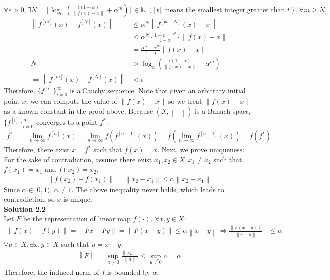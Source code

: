 \documentclass[a4paper,10.5pt]{article}
\newcommand{\N}{\mathbb{N}}
\newcommand{\norm}[1]{\left\lVert#1\right\rVert}
\begin{document}
$\forall \epsilon>0,\exists N = \bigg\lceil \log_\alpha\left(\frac{\epsilon(1-\alpha)}{\norm{f(x)-x}}+\alpha^m\right) \bigg\rceil \in \N \ (\lceil t \rceil \text{ means the smallest integer greater than } t),\forall m \geq N,$
\begin{align*}
\norm{f^{[m]}(x)-f^{[N]}(x)} 
&\leq \alpha^N \norm{f^{[m-N]}(x)-x} \\
&\leq \alpha^N \cdot \frac{1-\alpha^{m-N}}{1-\alpha} \cdot \norm{f(x)-x} \\
&= \frac{\alpha^N-\alpha^{m}}{1-\alpha} \norm{f(x)-x} \\
N&>\log_\alpha\left(\frac{\epsilon(1-\alpha)}{\norm{f(x)-x}}+\alpha^m\right) \\
\Rightarrow \norm{f^{[m]}(x)-f^{[N]}(x)} &< \epsilon
\end{align*}
Therefore, $\{f^{[i]}\}_{i=0}^{\infty}$ is a Cauchy sequence.
Note that given an arbitrary initial point $x$, we can compute the value of $\|f(x)-x\|$ so we treat $\|f(x)-x\|$ as a known constant in the proof above. Because $\left(X, \left\lVert\cdot\right\rVert\right)$ is a Banach space, $\{f^{[i]}\}_{i=0}^{\infty}$ converges to a point $f^*$.
\begin{align*}
	f^* &=\lim_{n\to\infty}f^{[n]}(x) = \lim_{n\to\infty}f\left(f^{[n-1]}(x)\right) = f\left(\lim_{n\to\infty}f^{[n-1]}(x)\right) = f(f^*) 
\end{align*}
Therefore, there exist $\bar{x}=f^*$ such that $f(\bar{x}) = \bar{x}$. Next, we prove uniqueness: For the sake of contradiction, assume there exist $\bar{x}_1,\bar{x}_2 \in X, \bar{x}_1 \neq \bar{x}_2$ such that $f(\bar{x}_1)=\bar{x}_1$ and $f(\bar{x}_2)=\bar{x}_2$.
\begin{align*}
	\norm{f(\bar{x}_2)-f(\bar{x}_1)} =\norm{\bar{x}_2-\bar{x}_1} \leq \alpha\norm{\bar{x}_2-\bar{x}_1}	
\end{align*}
Since $\alpha \in [0,1)$, $\alpha \neq 1$. The above inequality never holds, which leads to contradiction, so $\bar{x}$ is unique. \\

\noindent \textbf {Solution 2.2} \\
Let $F$ be the representation of linear map $f(\cdot)$. $\forall x,y \in X$:
\begin{align*}
\norm{f(x)-f(y)} = \norm{Fx-Fy} = \norm{F(x-y)} \leq \alpha \norm{x-y} \Rightarrow \frac{\norm{F(x-y)}}{\norm{x-y}} &\leq \alpha
\end{align*}
$\forall u \in X, \exists x,y \in X$ such that $u = x-y$.
\begin{align*}
\norm{F} = \sup_{u\neq 0}\frac{\norm{Fu}}{\norm{u}} \leq \sup_{u\neq 0} \alpha = \alpha
\end{align*}
Therefore, the induced norm of $f$ is bounded by $\alpha$.
\end{document}
